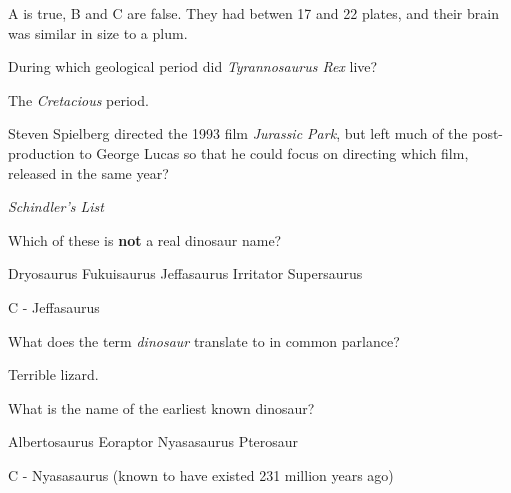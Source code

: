\documentclass[answers]{exam}
\begin{document}
\begin{questions}
    \begin{solution}
        A is true, B and C are false. They had betwen 17 and 22 plates, and their brain was similar in size to a plum.
    \end{solution}

    \question During which geological period did \emph{Tyrannosaurus Rex} live?

    \begin{solution}
        The \emph{Cretacious} period.
    \end{solution}

    \question Steven Spielberg directed the 1993 film \emph{Jurassic Park}, but left much of the post-production to George Lucas so that he could focus on directing which film, released in the same year?

    \begin{solution}
        \emph{Schindler's List}
    \end{solution}

    \question Which of these is \textbf{not} a real dinosaur name?

    \begin{choices}
        \choice Dryosaurus
        \choice Fukuisaurus
        \CorrectChoice Jeffasaurus
        \choice Irritator
        \choice Supersaurus
    \end{choices}

    \begin{solution}
        C - Jeffasaurus
    \end{solution}

    \question What does the term \emph{dinosaur} translate to in common parlance?

    \begin{solution}
        Terrible lizard.
    \end{solution}

    \question What is the name of the earliest known dinosaur?

    \begin{choices}
        \choice Albertosaurus
        \choice Eoraptor
        \choice Nyasasaurus
        \choice Pterosaur
    \end{choices}

    \begin{solution}
        C - Nyasasaurus (known to have existed 231 million years ago)
    \end{solution}


\end{questions}
\end{document}
